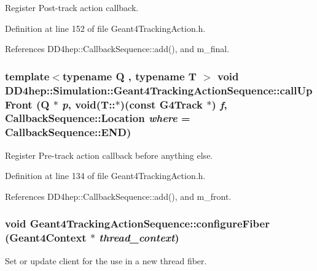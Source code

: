 Register Post-\/track action callback. 

Definition at line 152 of file Geant4TrackingAction.h.

References DD4hep::CallbackSequence::add(), and m\_\-final.\hypertarget{class_d_d4hep_1_1_simulation_1_1_geant4_tracking_action_sequence_a1da92534c2f0bdbfc917f4549ddcb154}{
\subsubsection[{callUpFront}]{\setlength{\rightskip}{0pt plus 5cm}template$<$typename Q , typename T $>$ void DD4hep::Simulation::Geant4TrackingActionSequence::callUpFront (Q $\ast$ {\em p}, \/  void(T::$\ast$)(const G4Track $\ast$) {\em f}, \/  {\bf CallbackSequence::Location} {\em where} = {\ttfamily CallbackSequence::END})}}
\label{class_d_d4hep_1_1_simulation_1_1_geant4_tracking_action_sequence_a1da92534c2f0bdbfc917f4549ddcb154}


Register Pre-\/track action callback before anything else. 

Definition at line 134 of file Geant4TrackingAction.h.

References DD4hep::CallbackSequence::add(), and m\_\-front.\hypertarget{class_d_d4hep_1_1_simulation_1_1_geant4_tracking_action_sequence_afff6a1aeeb049c8ee0ee2819d54b65d0}{
\subsubsection[{configureFiber}]{\setlength{\rightskip}{0pt plus 5cm}void Geant4TrackingActionSequence::configureFiber ({\bf Geant4Context} $\ast$ {\em thread\_\-context})}}
\label{class_d_d4hep_1_1_simulation_1_1_geant4_tracking_action_sequence_afff6a1aeeb049c8ee0ee2819d54b65d0}


Set or update client for the use in a new thread fiber. 


